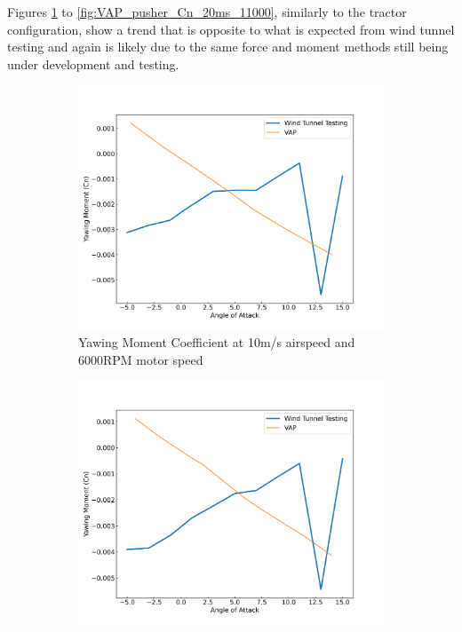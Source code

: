  Figures \ref{fig:VAP_pusher_Cn_10ms_6000} to \ref{fig:VAP_pusher_Cn_20ms_11000}, similarly to the tractor configuration, show a trend that is opposite to what is expected from wind tunnel testing and again is likely due to the same force and moment methods still being under development and testing. 
 
\begin{figure}[H]
    \centering
    \begin{subfigure}[b]{0.467\textwidth}
        \centering
        \includegraphics[width=\textwidth]{05_Results/VAP/pusher/Cn/10ms_6000RPM_Cn.png}
        \caption{Yawing Moment Coefficient at 10m/s airspeed and 6000RPM motor speed}
        \label{fig:VAP_pusher_Cn_10ms_6000}
    \end{subfigure}
    \begin{subfigure}[b]{0.467\textwidth}
        \centering
        \includegraphics[width=\textwidth]{05_Results/VAP/pusher/Cn/10ms_11000RPM_Cn.png}

\end{subfigure}
\end{figure}
